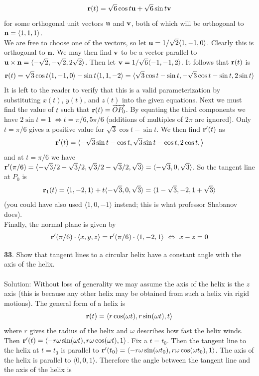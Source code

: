 \documentclass[12pt]{amsbook}
\newcommand{\la}{\langle}
\newcommand{\ra}{\rangle}
\begin{document}
\begin{enumerate}
  $${\bf r}(t)=\sqrt{6}\cos t {\bf u}+ \sqrt{6}\sin t{\bf v}$$
  for some orthogonal unit vectors ${\bf u}$ and ${\bf v}$, both of which will be orthogonal to ${\bf n}=\la 1,1,1\ra$. 
  \\
  We are free to choose one of the vectors, so let ${\bf u}=1/\sqrt{2}\la 1,-1,0 \ra$. Clearly this is orthogonal to ${\bf n}$. We may then find ${\bf v}$ to be a vector parallel to ${\bf u}\times{\bf n}=\la -\sqrt{2}, -\sqrt{2}, 2\sqrt{2} \ra$. Then let ${\bf v}=1/\sqrt{6}\la -1,-1,2\ra$. It follows that ${\bf r}(t)$ is
  $${\bf r}(t)=\sqrt{3}\cos t \la 1,-1,0 \ra-\sin t \la 1,1,-2 \ra=\la \sqrt{3}\cos t - \sin t, - \sqrt{3}\cos t - \sin t, 2\sin t \ra$$
  It is left to the reader to verify that this is a valid parameterization by substituting $x(t)$, $y(t)$, and $z(t)$ into the given equations. Next we must find the value of $t$ such that ${\bf r}(t)=\overrightarrow{OP_0}$. By equating the third components we have $2\sin t=1 \ \Leftrightarrow t=\pi/6, 5\pi/6$ (additions of multiples of $2\pi$ are ignored). Only $t=\pi/6$ gives a positive value for $\sqrt{3}\cos t-\sin t$. We then find ${\bf r}'(t)$ as
  $${\bf r}'(t)=\la -\sqrt{3}\sin t-\cos t, \sqrt{3}\sin t - \cos t, 2\cos t, \ra$$
  and at $t=\pi/6$ we have ${\bf r}'(\pi/6)=\la -\sqrt{3}/2-\sqrt{3}/2,\sqrt{3}/2-\sqrt{3}/2,\sqrt{3}\ra = \la -\sqrt{3},0,\sqrt{3} \ra$. So the tangent line at $P_0$ is
  $${\bf r}_1(t)=\la 1,-2,1 \ra + t\la -\sqrt{3},0,\sqrt{3}\ra = \la 1-\sqrt{3},-2,1+\sqrt{3} \ra $$
  (you could have also used $\la 1,0,-1\ra$ instead; this is what professor Shabanov does). 
  \\
  Finally, the normal plane is given by
  $${\bf r}'(\pi/6)\cdot\la x,y,z \ra={\bf r}'(\pi/6)\cdot\la 1,-2,1 \ra \ \Leftrightarrow \ x-z=0$$
  \end{enumerate}
{\small\bf 33}. Show that tangent lines to a circular helix have a constant angle with
the axis of the helix. 
\\
\\
{\sc Solution}: Without loss of generality we may assume the axis of the helix is the $z$ axis (this is because any other helix may be obtained from such a helix via rigid motions). The general form of a helix is
$${\bf r}(t)=\la r\cos(\omega t), r\sin(\omega t), t \ra$$
where $r$ gives the radius of the helix and $\omega$ describes how fast the helix winds. Then ${\bf r}'(t)=\la -r\omega\sin (\omega t), r\omega\cos (\omega t), 1 \ra$. Fix a $t=t_0$. Then the tangent line to the helix at $t=t_0$ is parallel to ${\bf r}'(t_0)=\la -r\omega\sin (\omega t_0), r\omega\cos (\omega t_0), 1 \ra$. The axis of the helix is parallel to $\la 0,0,1 \ra$. Therefore the angle between the tangent line and the axis of the helix is
\end{document}
